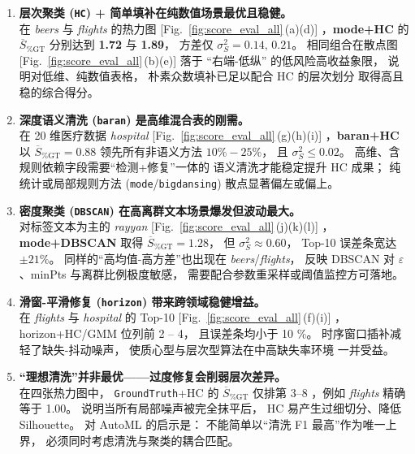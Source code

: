 \documentclass[10pt]{article} %
\numberwithin{equation}{section}
\begin{document}
\begin{enumerate}[label=\textbf{\arabic*.},leftmargin=2.4em]

  \item \textbf{层次聚类 (\texttt{HC}) + 简单填补在纯数值场景最优且稳健。}\\
        在 \emph{beers} 与 \emph{flights} 的热力图
        [Fig.~\ref{fig:score_eval_all}\,(a)(d)]
        ，\textbf{mode+HC} 的
        \(\overline{S}_{\%\mathrm{GT}}\) 分别达到
        \textbf{1.72} 与 \textbf{1.89}，
        方差仅 \(\sigma^{2}_{S}=0.14,\,0.21\)。
        相同组合在散点图
        [Fig.~\ref{fig:score_eval_all}\,(b)(e)]
        落于 “右端-低纵” 的低风险高收益象限，
        说明对低维、纯数值表格，
        朴素众数填补已足以配合 HC 的层次划分
        取得高且稳的综合得分。

  \item \textbf{深度语义清洗 (\texttt{baran}) 是高维混合表的刚需。}\\
        在 20 维医疗数据 \emph{hospital}
        [Fig.~\ref{fig:score_eval_all}\,(g)(h)(i)]
        ，\textbf{baran+HC} 以
        \(\overline{S}_{\%\mathrm{GT}}=0.88\)
        领先所有非语义方法 \(10\%-25\%\)，
        且 \(\sigma^{2}_{S}\le0.02\)。
        高维、含规则依赖字段需要“检测+修复”一体的
        语义清洗才能稳定提升 HC 成果；
        纯统计或局部规则方法 (\texttt{mode}/\texttt{bigdansing})
        散点显著偏左或偏上。

  \item \textbf{密度聚类 (\texttt{DBSCAN}) 在高离群文本场景爆发但波动最大。}\\
        对标签文本为主的 \emph{rayyan}
        [Fig.~\ref{fig:score_eval_all}\,(j)(k)(l)]
        ，\textbf{mode+DBSCAN} 取得
        \(\overline{S}_{\%\mathrm{GT}}=1.28\)，
        但 \(\sigma^{2}_{S}\approx0.60\)，
        Top-10 误差条宽达 \(\pm21\%\)。
        同样的“高均值-高方差”也出现在
        \emph{beers}/\emph{flights}，
        反映 DBSCAN 对
        \(\varepsilon\)、minPts 与离群比例极度敏感，
        需要配合参数重采样或阈值监控方可落地。

  \item \textbf{滑窗-平滑修复 (\texttt{horizon}) 带来跨领域稳健增益。}\\
        在 \emph{flights} 与 \emph{hospital} 的 Top-10
        [Fig.~\ref{fig:score_eval_all}\,(f)(i)]
        ，horizon+HC/GMM 位列前 2 – 4，
        且误差条均小于 10 \%。
        时序窗口插补减轻了缺失-抖动噪声，
        使质心型与层次型算法在中高缺失率环境
        一并受益。

  \item \textbf{“理想清洗”并非最优——过度修复会削弱层次差异。}\\
        在四张热力图中，
        \texttt{GroundTruth}+HC 的
        \(\overline{S}_{\%\mathrm{GT}}\) 仅排第 3–8
        ，例如 \emph{flights} 精确等于 1.00。
        说明当所有局部噪声被完全抹平后，
        HC 易产生过细切分、降低 Silhouette。
        对 AutoML 的启示是：
        不能简单以“清洗 F1 最高”作为唯一上界，
        必须同时考虑清洗与聚类的耦合匹配。

\end{enumerate}
\end{document}

